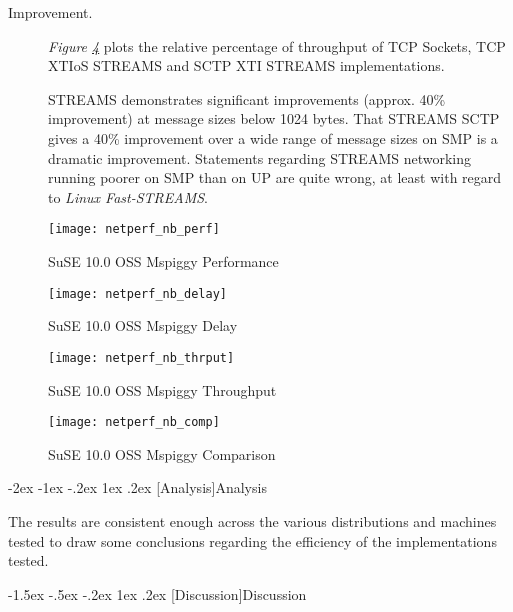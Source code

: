 \documentclass[letterpaper,final,notitlepage,twocolumn,10pt,twoside]{article}
\makeatletter
\renewcommand\section{\@startsection {section}{1}{\z@}%
                                   {-2ex \@plus -1ex \@minus -.2ex}%
                                   {1ex \@plus .2ex}%
                                   {\normalfont\large\bfseries}}
\renewcommand\subsection{\@startsection{subsection}{2}{\z@}%
                                     {-1.5ex \@plus -.5ex \@minus -.2ex}%
                                     {1ex \@plus .2ex}%
                                     {\normalfont\normalsize\bfseries}}
\makeatother
\begin{document}
\begin{description}
\item[Improvement.]

\textit{Figure \ref{figure:nbcomp}}
plots the relative percentage of throughput of TCP Sockets, TCP XTIoS STREAMS and SCTP XTI STREAMS
implementations.

STREAMS demonstrates significant improvements (approx. 40\% improvement) at message sizes below 1024
bytes.  That STREAMS SCTP gives a 40\% improvement over a wide range of message sizes on SMP is a
dramatic improvement.  Statements regarding STREAMS networking running poorer on SMP than on UP are
quite wrong, at least with regard to \textsl{Linux Fast-STREAMS}.

\end{description}

\begin{figure}[p]
\center\texttt{[image: netperf\_nb\_perf]}
\caption[SuSE 10.0 OSS Mspiggy Performance]{SuSE 10.0 OSS Mspiggy Performance}
\label{figure:nbperf}
\end{figure}

\begin{figure}[p]
\center\texttt{[image: netperf\_nb\_delay]}
\caption[SuSE 10.0 OSS Mspiggy Delay]{SuSE 10.0 OSS Mspiggy Delay}
\label{figure:nbdly}
\end{figure}

\begin{figure}[p]
\center\texttt{[image: netperf\_nb\_thrput]}
\caption[SuSE 10.0 OSS Mspiggy Throughput]{SuSE 10.0 OSS Mspiggy Throughput}
\label{figure:nbthrput}
\end{figure}

\begin{figure}[p]
\center\texttt{[image: netperf\_nb\_comp]}
\caption[SuSE 10.0 OSS Mspiggy Comparison]{SuSE 10.0 OSS Mspiggy Comparison}
\label{figure:nbcomp}
\end{figure}


\section[Analysis]{Analysis}

The results are consistent enough across the various distributions and machines tested to draw some
conclusions regarding the efficiency of the implementations tested.

\subsection[Discussion]{Discussion}
\end{document}
